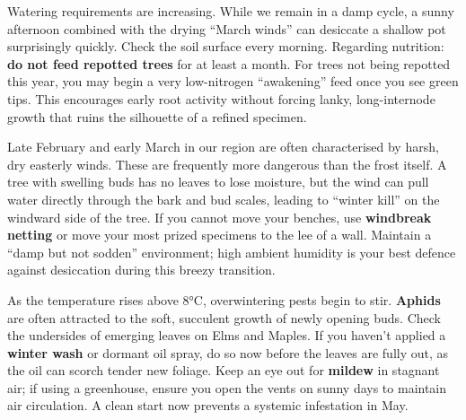 \medskip
{}
\noindent
Watering requirements are increasing.
While we remain in a damp cycle, a sunny afternoon combined with the drying ``March winds'' can desiccate a shallow pot surprisingly quickly.
Check the soil surface every morning.
Regarding nutrition: \textbf{do not feed repotted trees} for at least a month.
For trees not being repotted this year, you may begin a very low\--nitrogen ``awakening'' feed once you see green tips.
This encourages early root activity without forcing lanky, long\--internode growth that ruins the silhouette of a refined specimen.

\medskip
{}
\noindent
Late February and early March in our region are often characterised by harsh, dry easterly winds.
These are frequently more dangerous than the frost itself.
A tree with swelling buds has no leaves to lose moisture, but the wind can pull water directly through the bark and bud scales, leading to ``winter kill'' on the windward side of the tree.
If you cannot move your benches, use \textbf{windbreak netting} or move your most prized specimens to the lee of a wall.
Maintain a ``damp but not sodden'' environment; high ambient humidity is your best defence against desiccation during this breezy transition.

\medskip
{}
\noindent
As the temperature rises above 8°C, overwintering pests begin to stir.
\textbf{Aphids} are often attracted to the soft, succulent growth of newly opening buds.
Check the undersides of emerging leaves on Elms and Maples.
If you haven't applied a \textbf{winter wash} or dormant oil spray, do so now before the leaves are fully out, as the oil can scorch tender new foliage.
Keep an eye out for \textbf{mildew} in stagnant air; if using a greenhouse, ensure you open the vents on sunny days to maintain air circulation.
A clean start now prevents a systemic infestation in May.
\closearticle
\columnbreak


